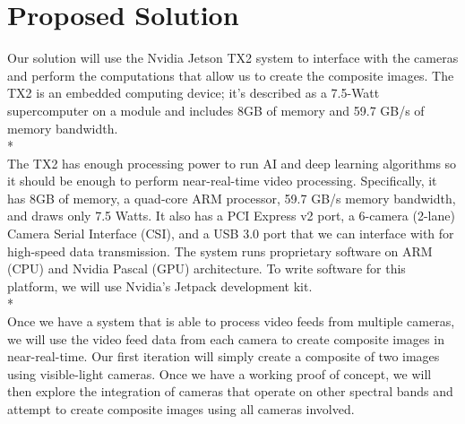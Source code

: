 \documentclass[10pt,letterpaper,draftclsnofoot,onecolumn]{report}
\begin{document}
\section*{Proposed Solution}
Our solution will use the Nvidia Jetson TX2 system to interface with the cameras and perform the computations that allow us to create the composite images. The TX2 is an embedded computing device; it's described as a 7.5-Watt supercomputer on a module and includes 8GB of memory and 59.7 GB/s of memory bandwidth. 
\\*\\
The TX2 has enough processing power to run AI and deep learning algorithms so it should be enough to perform near-real-time video processing. Specifically, it has 8GB of memory, a quad-core ARM processor, 59.7 GB/s memory bandwidth, and draws only 7.5 Watts. It also has a PCI Express v2 port, a 6-camera (2-lane) Camera Serial Interface (CSI), and a USB 3.0 port that we can interface with for high-speed data transmission. The system runs proprietary software on ARM (CPU) and Nvidia Pascal (GPU) architecture. To write software for this platform, we will use Nvidia's Jetpack development kit.
\\*\\
Once we have a system that is able to process video feeds from multiple cameras, we will use the video feed data from each camera to create composite images in near-real-time. Our first iteration will simply create a composite of two images using visible-light cameras. Once we have a working proof of concept, we will then explore the integration of cameras that operate on other spectral bands and attempt to create composite images using all cameras involved.
\end{document}
